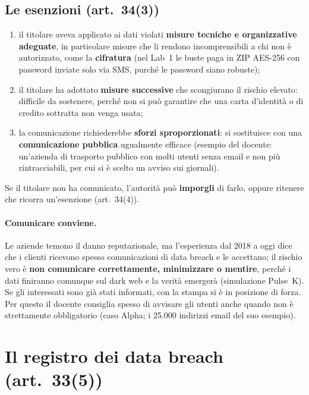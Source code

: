 \subsection{Le esenzioni (art.~34(3))}
\begin{enumerate}[label=(\alph*)]
  \item il titolare aveva applicato ai dati violati \textbf{misure tecniche e organizzative adeguate},
    in particolare misure che li rendono incomprensibili a chi non è autorizzato, come la
    \textbf{cifratura} (nel Lab~1 le buste paga in ZIP AES-256 con password inviate solo via SMS,
    purché le password siano robuste);
  \item il titolare ha adottato \textbf{misure successive} che scongiurano il rischio elevato: difficile
    da sostenere, perché non si può garantire che una carta d'identità o di credito sottratta non venga
    usata;
  \item la comunicazione richiederebbe \textbf{sforzi sproporzionati}: si sostituisce con una
    \textbf{comunicazione pubblica} ugualmente efficace (esempio del docente: un'azienda di trasporto
    pubblico con molti utenti senza email e non più rintracciabili, per cui si è scelto un avviso sui
    giornali).
\end{enumerate}
Se il titolare non ha comunicato, l'autorità può \textbf{imporgli} di farlo, oppure ritenere che ricorra
un'esenzione (art.~34(4)).

\paragraph{Comunicare conviene.} Le aziende temono il danno reputazionale, ma l'esperienza dal 2018 a oggi
dice che i clienti ricevono spesso comunicazioni di data breach e le accettano; il rischio vero è
\textbf{non comunicare correttamente, minimizzare o mentire}, perché i dati finiranno comunque sul dark
web e la verità emergerà (simulazione Pulse~K). Se gli interessati sono già stati informati, con la
stampa si è in posizione di forza. Per questo il docente consiglia spesso di avvisare gli utenti anche
quando non è strettamente obbligatorio (caso Alpha; i 25.000 indirizzi email del suo esempio).

\section{Il registro dei data breach (art.~33(5))}
\label{sec:breach-registro}

